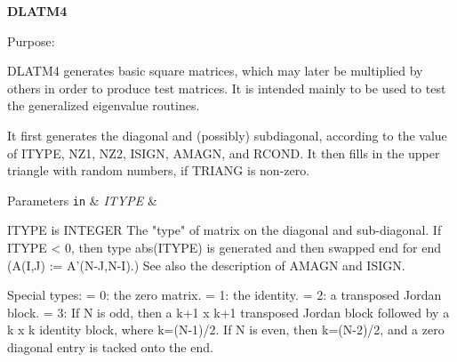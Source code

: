 {\bfseries D\+L\+A\+T\+M4} 

\begin{DoxyParagraph}{Purpose\+: }
\begin{DoxyVerb} DLATM4 generates basic square matrices, which may later be
 multiplied by others in order to produce test matrices.  It is
 intended mainly to be used to test the generalized eigenvalue
 routines.

 It first generates the diagonal and (possibly) subdiagonal,
 according to the value of ITYPE, NZ1, NZ2, ISIGN, AMAGN, and RCOND.
 It then fills in the upper triangle with random numbers, if TRIANG is
 non-zero.\end{DoxyVerb}
 
\end{DoxyParagraph}

\begin{DoxyParams}[1]{Parameters}
\mbox{\tt in}  & {\em I\+T\+Y\+P\+E} & \begin{DoxyVerb}          ITYPE is INTEGER
          The "type" of matrix on the diagonal and sub-diagonal.
          If ITYPE < 0, then type abs(ITYPE) is generated and then
             swapped end for end (A(I,J) := A'(N-J,N-I).)  See also
             the description of AMAGN and ISIGN.

          Special types:
          = 0:  the zero matrix.
          = 1:  the identity.
          = 2:  a transposed Jordan block.
          = 3:  If N is odd, then a k+1 x k+1 transposed Jordan block
                followed by a k x k identity block, where k=(N-1)/2.
                If N is even, then k=(N-2)/2, and a zero diagonal entry
                is tacked onto the end.


\end{DoxyVerb}
\end{DoxyParams}
